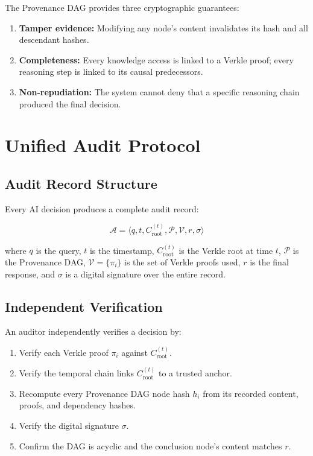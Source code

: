 \documentclass[11pt,a4paper]{article}
\begin{document}
The Provenance DAG provides three cryptographic guarantees:

\begin{enumerate}[noitemsep]
    \item \textbf{Tamper evidence:} Modifying any node's content invalidates its hash and all descendant hashes.
    \item \textbf{Completeness:} Every knowledge access is linked to a Verkle proof; every reasoning step is linked to its causal predecessors.
    \item \textbf{Non-repudiation:} The system cannot deny that a specific reasoning chain produced the final decision.
\end{enumerate}

\section{Unified Audit Protocol}
\label{sec:audit}

\subsection{Audit Record Structure}

Every AI decision produces a complete audit record:

\begin{equation}
\mathcal{A} = \langle q, t, C_{\text{root}}^{(t)}, \mathcal{P}, \mathcal{V}, r, \sigma \rangle
\label{eq:audit}
\end{equation}

where $q$ is the query, $t$ is the timestamp, $C_{\text{root}}^{(t)}$ is the Verkle root at time $t$, $\mathcal{P}$ is the Provenance DAG, $\mathcal{V} = \{\pi_i\}$ is the set of Verkle proofs used, $r$ is the final response, and $\sigma$ is a digital signature over the entire record.

\subsection{Independent Verification}

An auditor independently verifies a decision by:

\begin{enumerate}[noitemsep]
    \item Verify each Verkle proof $\pi_i$ against $C_{\text{root}}^{(t)}$.
    \item Verify the temporal chain links $C_{\text{root}}^{(t)}$ to a trusted anchor.
    \item Recompute every Provenance DAG node hash $h_i$ from its recorded content, proofs, and dependency hashes.
    \item Verify the digital signature $\sigma$.
    \item Confirm the DAG is acyclic and the conclusion node's content matches $r$.
\end{enumerate}
\end{document}
